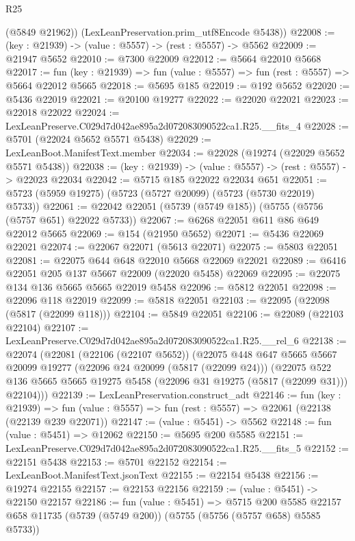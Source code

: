 \begin{lexlean}{R25}
\begin{coremodule}
        (@5849 @21962))
      (LexLeanPreservation.prim_utf8Encode @5438))
@22008 := (key : @21939) -> (value : @5557) -> (rest : @5557) -> @5562
@22009 := @21947 @5652
@22010 := @7300 @22009
@22012 := @5664 @22010 @5668
@22017 := fun (key : @21939) => fun (value : @5557) => fun (rest : @5557) => @5664 @22012 @5665
@22018 := @5695 @185
@22019 := @192 @5652
@22020 := @5436 @22019
@22021 := @20100 @19277
@22022 := @22020 @22021
@22023 := @22018 @22022
@22024 := LexLeanPreserve.C029d7d042ae895a2d072083090522ca1.R25.__fits_4
@22028 := @5701 (@22024 @5652 @5571 @5438)
@22029 := LexLeanBoot.ManifestText.member
@22034 := @22028 (@19274 (@22029 @5652 @5571 @5438))
@22038 := (key : @21939) -> (value : @5557) -> (rest : @5557) -> @22023 @22034
@22042 := @5715 @185 @22022 @22034 @651
@22051 := @5723 (@5959 @19275) (@5723 (@5727 @20099) (@5723 (@5730 @22019) @5733))
@22061 := @22042 @22051 (@5739 (@5749 @185)) (@5755 (@5756 (@5757 @651) @22022 @5733))
@22067 := @6268 @22051 @611 @86 @649 @22012 @5665
@22069 := @154 (@21950 @5652)
@22071 := @5436 @22069 @22021
@22074 := @22067 @22071 (@5613 @22071)
@22075 := @5803 @22051
@22081 := @22075 @644 @648 @22010 @5668 @22069 @22021
@22089 := @6416 @22051 @205 @137 @5667 @22009 (@22020 @5458) @22069
@22095 := @22075 @134 @136 @5665 @5665 @22019 @5458
@22096 := @5812 @22051
@22098 := @22096 @118 @22019
@22099 := @5818 @22051
@22103 := @22095 (@22098 (@5817 (@22099 @118)))
@22104 := @5849 @22051
@22106 := @22089 (@22103 @22104)
@22107 := LexLeanPreserve.C029d7d042ae895a2d072083090522ca1.R25.__rel_6
@22138 := @22074
    (@22081
      (@22106 (@22107 @5652))
      (@22075
        @448
        @647
        @5665
        @5667
        @20099
        @19277
        (@22096 @24 @20099 (@5817 (@22099 @24)))
        (@22075
          @522
          @136
          @5665
          @5665
          @19275
          @5458
          (@22096 @31 @19275 (@5817 (@22099 @31)))
          @22104)))
@22139 := LexLeanPreservation.construct_adt
@22146 := fun (key : @21939) =>
  fun (value : @5557) => fun (rest : @5557) => @22061 (@22138 (@22139 @239 @22071))
@22147 := (value : @5451) -> @5562
@22148 := fun (value : @5451) => @12062
@22150 := @5695 @200 @5585
@22151 := LexLeanPreserve.C029d7d042ae895a2d072083090522ca1.R25.__fits_5
@22152 := @22151 @5438
@22153 := @5701 @22152
@22154 := LexLeanBoot.ManifestText.jsonText
@22155 := @22154 @5438
@22156 := @19274 @22155
@22157 := @22153 @22156
@22159 := (value : @5451) -> @22150 @22157
@22186 := fun (value : @5451) =>
  @5715
    @200
    @5585
    @22157
    @658
    @11735
    (@5739 (@5749 @200))
    (@5755 (@5756 (@5757 @658) @5585 @5733))

\end{coremodule}
\end{lexlean}
